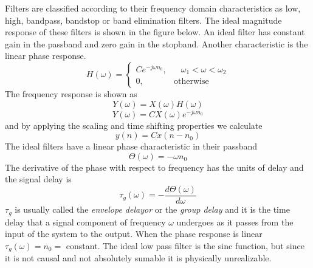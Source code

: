 \documentclass{article} %
\begin{document}
	Filters are classified according to their frequency domain characteristics as low, high, bandpass, bandstop or band elimination filters. The ideal magnitude response of these filters is shown in the figure below. An ideal filter has constant gain in the passband and zero gain in the stopband. Another characteristic is the linear phase response.
	\begin{equation}
	H(\omega) = 
		\begin{cases}
      	Ce^{-j\omega n_0}, & \;\;\; \omega_1 < \omega < \omega_2 \\
      	0, & \text{otherwise}
    	\end{cases} 
	\end{equation}
	The frequency response is shown as 
	\begin{equation}
	Y(\omega) = X(\omega)H(\omega)
	\end{equation}
	\begin{equation}
	Y(\omega) = CX(\omega)e^{-j\omega n_0}
	\end{equation}
	and by applying the scaling and time shifting properties we calculate
	\begin{equation}
	y(n) = Cx(n-n_0)
	\end{equation}
	The ideal filters have a linear phase characteristic in their passband
	\begin{equation}
	\Theta(\omega) = -\omega n_0
	\end{equation}
	The derivative of the phase with respect to frequency has the units of delay and the signal delay is
	\begin{equation}
	\tau_g (\omega) = -\frac{d\Theta(\omega)}{d\omega}
	\end{equation}
	$\tau_g$ is usually called the \textit{envelope delayor} or the \textit{group delay} and it is the time delay that a signal component of frequency $\omega$ undergoes as it passes from the input of the system to the output. When the phase response is linear $\tau_g (\omega) = n_0 = $ constant. The ideal low pass filter is the sinc function, but since it is not causal and not absolutely sumable it is physically unrealizable. 
\end{document}
